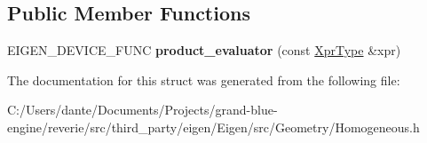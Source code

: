 \subsection*{Public Member Functions}
\begin{DoxyCompactItemize}
\item 
\mbox{\label{struct_eigen_1_1internal_1_1product__evaluator_3_01_product_3_01_lhs_00_01_rhs_00_01_lazy_producdc5bcb3d77429f754f91ead5635235a9_aeac49da391f46a225196a8efca7c09ca}} 
E\+I\+G\+E\+N\+\_\+\+D\+E\+V\+I\+C\+E\+\_\+\+F\+U\+NC {\bfseries product\+\_\+evaluator} (const \mbox{\hyperlink{class_eigen_1_1_product}{Xpr\+Type}} \&xpr)
\end{DoxyCompactItemize}


The documentation for this struct was generated from the following file\+:\begin{DoxyCompactItemize}
\item 
C\+:/\+Users/dante/\+Documents/\+Projects/grand-\/blue-\/engine/reverie/src/third\+\_\+party/eigen/\+Eigen/src/\+Geometry/Homogeneous.\+h\end{DoxyCompactItemize}
